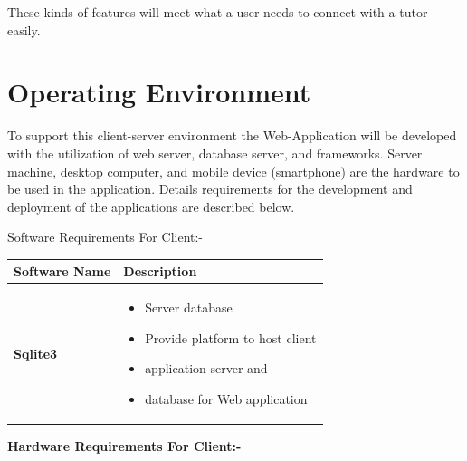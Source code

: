 These kinds of features will meet what a user needs to connect with a tutor easily. 


\section{Operating Environment}
To support this client-server environment the Web-Application will be developed with the utilization of web server, database server, and frameworks. Server machine, desktop computer, and mobile device (smartphone) are the hardware to be used in the application. Details requirements for the development and deployment of the applications are described below.

Software Requirements For Client:-
\begin{center}
\setlength{\tabcolsep}{0.8cm}
\renewcommand{\arraystretch}{1.2}
        \centering
        \begin{longtable}{|m{90pt}|p{9cm}|}
            \hline
                \textbf{Software Name} &\textbf{ Description}\\
            \hline
                \textbf{Sqlite3} &
                    \begin{itemize}
                        \item  Server database
                        \item Provide platform to host client
                        \item application server and
                        \item database for Web application
                    \end{itemize}\\
            \hline
        \end{longtable}
\end{center}
\textbf{Hardware Requirements For Client:-}
